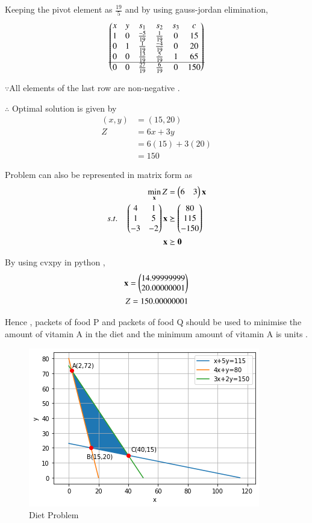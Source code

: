 \documentclass[journal,12pt,twocolumn]{IEEEtran}
\begin{document}
Keeping the pivot element as $\frac{19}{5}$ and by using gauss-jordan elimination,
\begin{align}
\begin{pmatrix}
 x & y & s_1 & s_2 & s_3 & c  \\ 
  1 & 0 & \frac{-5}{19} & \frac{1}{19} & 0 & 15 \\ 
  0 & 1 & \frac{1}{19} & \frac{-4}{19} & 0 & 20  \\ 
  0 & 0 & \frac{13}{19} & \frac{5}{19} & 1 & 65 \\ \hline
  0 & 0 & \frac{27}{19} & \frac{6}{19} & 0 & 150
\end{pmatrix}
\end{align}

$\because$All elements of the last row are non-negative .

$\therefore$ Optimal solution is given by
\begin{align}
    (x,y) &= (15,20)
    \\
    Z &= 6x + 3y
    \\
    &= 6(15) + 3(20)
    \\
    &= 150
\end{align}

Problem can also be represented in matrix form as
\begin{align}
        \min_{\mathbf{x}} Z &= \begin{pmatrix}6 & 3\end{pmatrix}\mathbf{x}\\
        s.t. \quad 
        \begin{pmatrix}4 & 1 \\ 1 & 5 \\ -3 & -2 \end{pmatrix}\mathbf{x} &\succeq \begin{pmatrix}80\\115\\-150\end{pmatrix} \\
        \mathbf{x} &\succeq \mathbf{0}
    \end{align}
    
By using cvxpy in python ,
\begin{align}
    \mathbf{x}=\begin{pmatrix}14.99999999\\20.00000001\end{pmatrix}\\
    Z = 150.00000001
\end{align}

Hence , packets of food P and  packets of food Q should be used to minimise the amount of vitamin A in the diet and the minimum amount of vitamin A is  units .

\begin{figure}[!ht]
\centering
\includegraphics[width=\columnwidth]{Figure12}
\caption{Diet Problem}
\label{fig:diet problem}	
\end{figure}
\end{document}
